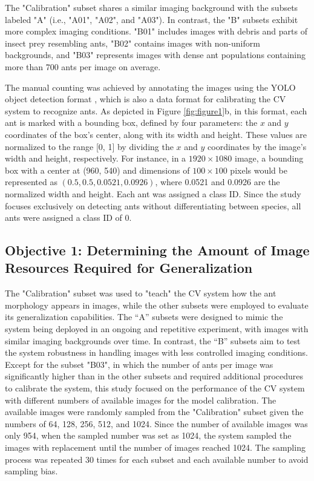 The "Calibration" subset shares a similar imaging background with the subsets labeled "A" (i.e., "A01", "A02", and "A03"). In contrast, the "B" subsets exhibit more complex imaging conditions. "B01" includes images with debris and parts of insect prey resembling ants, "B02" contains images with non-uniform backgrounds, and "B03" represents images with dense ant populations containing more than 700 ants per image on average.

The manual counting was achieved by annotating the images using the YOLO object detection format \cite{Jocher2023YOLO}, which is also a data format for calibrating the CV system to recognize ants. As depicted in Figure \ref{fig:figure1}b, in this format, each ant is marked with a bounding box, defined by four parameters: the $x$ and $y$ coordinates of the box's center, along with its width and height. These values are normalized to the range [0, 1] by dividing the $x$ and $y$ coordinates by the image's width and height, respectively. For instance, in a $1920 \times 1080$ image, a bounding box with a center at (960, 540) and dimensions of $100 \times 100$ pixels would be represented as $(0.5, 0.5, 0.0521, 0.0926)$, where 0.0521 and 0.0926 are the normalized width and height. Each ant was assigned a class ID. Since the study focuses exclusively on detecting ants without differentiating between species, all ants were assigned a class ID of 0.

\subsection{Objective 1: Determining the Amount of Image Resources Required for Generalization}

The "Calibration" subset was used to "teach" the CV system how the ant morphology appears in images, while the other subsets were employed to evaluate its generalization capabilities. The “A” subsets were designed to mimic the system being deployed in an ongoing and repetitive experiment, with images with similar imaging backgrounds over time. In contrast, the “B” subsets aim to test the system robustness in handling images with less controlled imaging conditions. Except for the subset "B03", in which the number of ants per image was significantly higher than in the other subsets and required additional procedures to calibrate the system, this study focused on the performance of the CV system with different numbers of available images for the model calibration. The available images were randomly sampled from the "Calibration" subset given the numbers of 64, 128, 256, 512, and 1024. Since the number of available images was only 954, when the sampled number was set as 1024, the system sampled the images with replacement until the number of images reached 1024. The sampling process was repeated 30 times for each subset and each available number to avoid sampling bias.

